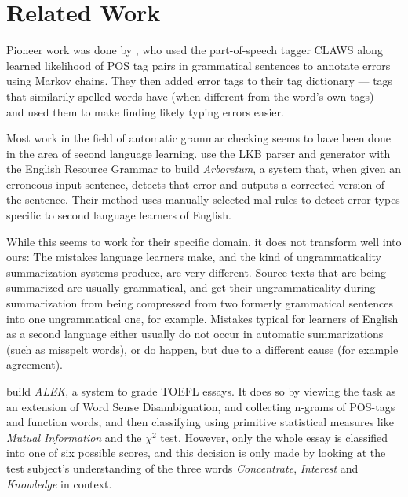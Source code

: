 \documentclass[a4paper,10pt]{scrartcl}
\theoremstyle{style}
\begin{document}
\section{Related Work}
\label{related_work}

Pioneer work was done by \cite{atwell1987detect}, who used the part-of-speech tagger CLAWS \citep{leech1983automatic} along learned likelihood of POS tag pairs in grammatical sentences to annotate errors using Markov chains.
They then added error tags to their tag dictionary --- tags that similarily spelled words have (when different from the word's own tags) --- and used them to make finding likely typing errors easier.

Most work in the field of automatic grammar checking seems to have been done in the area of second language learning.
\cite{bender2004arboretum} use the LKB parser and generator \cite{copestake2002implementing} with the English Resource Grammar \citep{flickinger2000building} to build \textit{Arboretum}, a system that, when given an erroneous input sentence, detects that error and outputs a corrected version of the sentence. Their method uses manually selected mal-rules \citep{schneider1998recognizing} to detect error types specific to second language learners of English.

While this seems to work for their specific domain, it does not transform well into ours: The mistakes language learners make, and the kind of ungrammaticality summarization systems produce, are very different. Source texts that are being summarized are usually grammatical, and get their ungrammaticality during summarization from being compressed from two formerly grammatical sentences into one ungrammatical one, for example. Mistakes typical for learners of English as a second language either usually do not occur in automatic summarizations (such as misspelt words), or do happen, but due to a different cause (for example agreement).

\cite{chodorow2000unsupervised} build \textit{ALEK}, a system to grade TOEFL essays. It does so by viewing the task as an extension of Word Sense Disambiguation, and collecting n-grams of POS-tags and function words, and then classifying using primitive statistical measures like \textit{Mutual Information} and the $\chi^2$ test. However, only the whole essay is classified into one of six possible scores, and this decision is only made by looking at the test subject's understanding of the three words \textit{Concentrate}, \textit{Interest} and \textit{Knowledge} in context.
\end{document}

